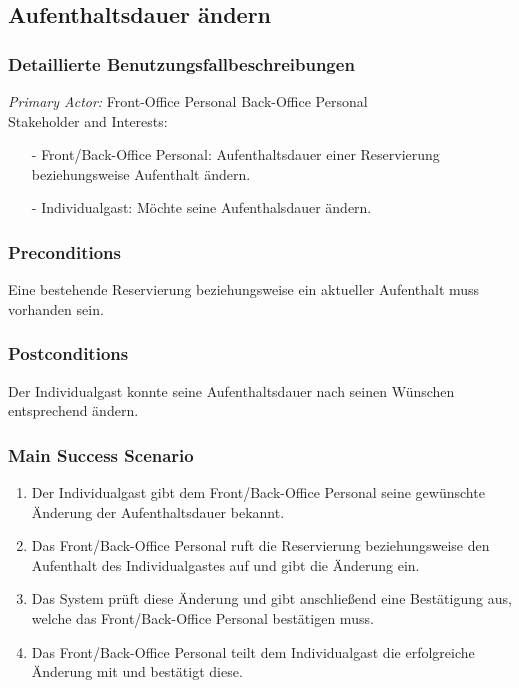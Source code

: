 \documentclass[./detailed_overview_usecases.tex]{subfiles}
\begin{document}
    \subsection{Aufenthaltsdauer ändern}
    \subsubsection{Detaillierte Benutzungsfallbeschreibungen}
    \textit{Primary Actor:}
    Front-Office Personal
	Back-Office Personal
    \\
    Stakeholder and Interests:
    \begin{itemize}
        \item[-] Front/Back-Office Personal: Aufenthaltsdauer einer Reservierung beziehungsweise Aufenthalt ändern.
        \item[-] Individualgast: Möchte seine Aufenthalsdauer ändern.
    \end{itemize}

    \subsubsection*{Preconditions}
	Eine bestehende Reservierung beziehungsweise ein aktueller Aufenthalt muss vorhanden sein.
	
    \subsubsection*{Postconditions}
    Der Individualgast konnte seine Aufenthaltsdauer nach seinen Wünschen entsprechend ändern.
	
    \subsubsection*{Main Success Scenario}
    \begin{enumerate}
        \item Der Individualgast gibt dem Front/Back-Office Personal seine gewünschte Änderung der Aufenthaltsdauer bekannt.
        \item Das Front/Back-Office Personal ruft die Reservierung beziehungsweise den Aufenthalt des Individualgastes auf und gibt die Änderung ein.
	    \item Das System prüft diese Änderung und gibt anschließend eine Bestätigung aus, welche das Front/Back-Office Personal bestätigen muss.
	    \item Das Front/Back-Office Personal teilt dem Individualgast die erfolgreiche Änderung mit und bestätigt diese.
    \end{enumerate}
\end{document}
